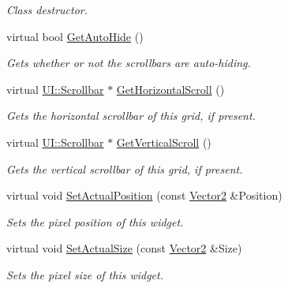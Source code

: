 \begin{DoxyCompactItemize}
\begin{DoxyCompactList}\small\item\em Class destructor. \item\end{DoxyCompactList}\item 
virtual bool \hyperlink{classMezzanine_1_1UI_1_1ScrolledCellGrid_ab631edc44667875821775d7a91ce6b27}{GetAutoHide} ()
\begin{DoxyCompactList}\small\item\em Gets whether or not the scrollbars are auto-\/hiding. \item\end{DoxyCompactList}\item 
virtual \hyperlink{classMezzanine_1_1UI_1_1Scrollbar}{UI::Scrollbar} $\ast$ \hyperlink{classMezzanine_1_1UI_1_1ScrolledCellGrid_ac50f4843ed5e9e65fdee56451341adcc}{GetHorizontalScroll} ()
\begin{DoxyCompactList}\small\item\em Gets the horizontal scrollbar of this grid, if present. \item\end{DoxyCompactList}\item 
virtual \hyperlink{classMezzanine_1_1UI_1_1Scrollbar}{UI::Scrollbar} $\ast$ \hyperlink{classMezzanine_1_1UI_1_1ScrolledCellGrid_a15cb0413fb4297936ad08e6334532d02}{GetVerticalScroll} ()
\begin{DoxyCompactList}\small\item\em Gets the vertical scrollbar of this grid, if present. \item\end{DoxyCompactList}\item 
virtual void \hyperlink{classMezzanine_1_1UI_1_1ScrolledCellGrid_a0daef581b08b9c5ca547bfc3db23a384}{SetActualPosition} (const \hyperlink{classMezzanine_1_1Vector2}{Vector2} \&Position)
\begin{DoxyCompactList}\small\item\em Sets the pixel position of this widget. \item\end{DoxyCompactList}\item 
virtual void \hyperlink{classMezzanine_1_1UI_1_1ScrolledCellGrid_ae55c3df53dd4e40e51df62a08a2a2f69}{SetActualSize} (const \hyperlink{classMezzanine_1_1Vector2}{Vector2} \&Size)
\begin{DoxyCompactList}\small\item\em Sets the pixel size of this widget. \item\end{DoxyCompactList}\item 

\end{DoxyCompactItemize}
